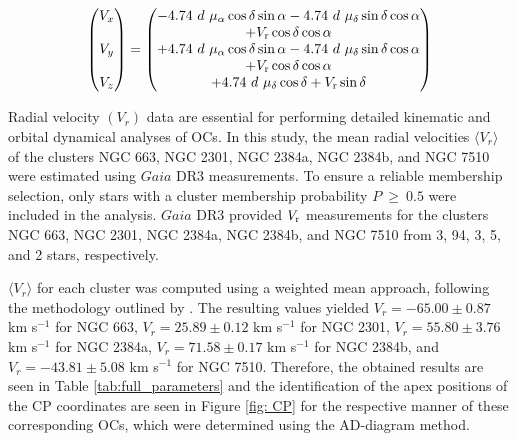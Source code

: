 \documentclass[referee]{raa}            %
\begin{document}
\begin{equation} \label{Eq. 9-10-11}
\begin{pmatrix}
V_x \\\\
V_y \\\\
V_z
\end{pmatrix} 
= 
\begin{pmatrix}
-4.74~d~\mu_\alpha\cos{\delta}\sin{\alpha} - 4.74~d~\mu_\delta\sin{\delta}\cos{\alpha} \\
+ V_{\rm r} \cos\delta \cos\alpha \\
+4.74~d~\mu_\alpha\cos{\delta}\sin{\alpha} - 4.74~d~\mu_\delta\sin{\delta}\cos{\alpha} \\
+ V_{\rm r} \cos\delta \cos\alpha \\
+4.74~d~\mu_\delta\cos\delta + V_{\rm r}\sin\delta
\end{pmatrix}
\end{equation}

Radial velocity $(V_r)$ data are essential for performing detailed kinematic and orbital dynamical analyses of OCs. In this study, the mean radial velocities $\langle V_r \rangle$ of the clusters NGC 663, NGC 2301, NGC 2384a, NGC 2384b, and NGC 7510 were estimated using $Gaia$ DR3 measurements. To ensure a reliable membership selection, only stars with a cluster membership probability $P~\ge~0.5$ were included in the analysis. $Gaia$ DR3 provided $V_{\rm r}$ measurements for the clusters NGC 663, NGC 2301, NGC 2384a, NGC 2384b, and NGC 7510 from 3, 94, 3, 5, and 2 stars, respectively.

$\langle V_r \rangle$ for each cluster was computed using a weighted mean approach, following the methodology outlined by \cite{Soubiran_2018}. The resulting values yielded $V_r=-65.00\pm0.87$ km s$^{-1}$ for NGC 663, $V_r=25.89\pm0.12$ km s$^{-1}$ for NGC 2301, $V_r=55.80\pm3.76$ km s$^{-1}$ for NGC 2384a, $V_r=71.58\pm0.17$ km s$^{-1}$ for NGC 2384b, and $V_r=-43.81\pm5.08$ km s$^{-1}$ for NGC 7510. Therefore, the obtained results are seen in Table \ref{tab:full_parameters} and the identification of the apex positions of the CP coordinates are seen in Figure \ref{fig: CP} for the respective manner of these corresponding OCs, which were determined using the AD-diagram method.
\end{document}
